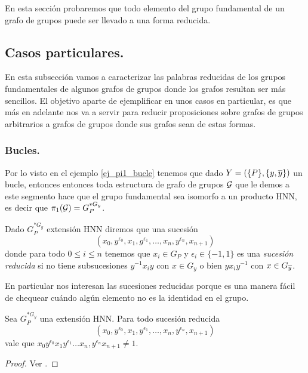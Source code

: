 \documentclass[tesis.tex]{subfiles}
\begin{document}
En esta sección probaremos que todo elemento del grupo fundamental de un grafo de grupos puede ser llevado a una forma reducida.

\subsection{Casos particulares.}

En esta subsección vamos a caracterizar las palabras reducidas de los grupos fundamentales de algunos grafos de grupos donde los grafos resultan ser más sencillos.
El objetivo aparte de ejemplificar en unos casos en particular, es que más en adelante nos va a servir para reducir proposiciones sobre grafos de grupos arbitrarios a grafos de grupos donde sus grafos sean de estas formas.

\subsubsection{Bucles.}\label{subsub_bucle}
Por lo visto en el ejemplo \ref{ej_pi1_bucle} tenemos que dado $Y = (\{P\}, \{y,\overline y\})$ un bucle, entonces entonces toda estructura de grafo de grupos ${\cal G}$ que le demos a este segmento 
hace que el grupo fundamental sea isomorfo a un producto HNN, es decir que $\pi_1({\cal G}) = G_P^{\ast G_y}$. 

\begin{deff}\label{deff_hnn_fn}
	Dado $G_P^{\ast G_y}$ extensión HNN diremos que una sucesión
	\[
		(x_{0},y^{\epsilon_0},x_{1},g^{\epsilon_1}, \dots, x_{n},y^{\epsilon_n},x_{n+1})
	\]
	donde para todo $0 \le i \le n$ tenemos que $x_{i} \in G_{P}$ y $\epsilon_{i} \in \{ -1,1 \}$
	es una \emph{sucesión reducida} si no tiene subsucesiones 
	$y^{-1}x_iy$ con $x \in G_{y}$ o bien $yx_iy^{-1}$ con $x \in G_{\overline y}$.	
\end{deff}

En particular nos interesan las sucesiones reducidas porque es una manera fácil de chequear cuándo algún elemento no es la identidad en el grupo.

\begin{prop}[Britton]\label{teo_britton}
	Sea $G_P^{\ast G_y}$ una extensión HNN.
	Para todo sucesión reducida
	\[
	(x_{0},y^{\epsilon_0},x_{1},y^{\epsilon_1}, \dots, x_{n},y^{\epsilon_n},x_{n+1})
	\]
	vale que $x_{0}y^{\epsilon_0}x_{1}y^{\epsilon_1} \dots x_{n},y^{\epsilon_n}x_{n+1} \neq 1$.
\end{prop}
\begin{proof}
	Ver \cite[p.182]{lyndon1977combinatorial}.
\end{proof}
\end{document}

